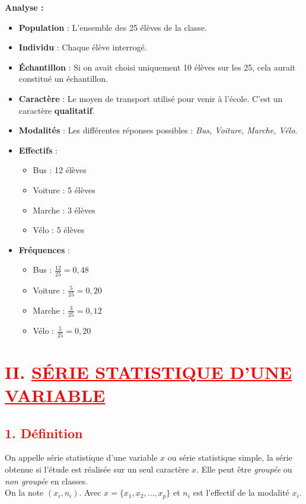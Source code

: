 \documentclass[12pt,a4paper]{article}
\begin{document}
\vspace{0.5cm}

\textbf{Analyse :}
\begin{itemize}
    \item \textbf{Population} : L’ensemble des 25 élèves de la classe.
    \item \textbf{Individu} : Chaque élève interrogé.
    \item \textbf{Échantillon} : Si on avait choisi uniquement 10 élèves sur les 25, cela aurait constitué un échantillon.
    \item \textbf{Caractère} : Le moyen de transport utilisé pour venir à l’école. C’est un caractère \textbf{qualitatif}.
    \item \textbf{Modalités} : Les différentes réponses possibles : \textit{Bus, Voiture, Marche, Vélo}.
    \item \textbf{Effectifs} :
    \begin{itemize}
        \item Bus : 12 élèves
        \item Voiture : 5 élèves
        \item Marche : 3 élèves
        \item Vélo : 5 élèves
    \end{itemize}
    \item \textbf{Fréquences} :
    \begin{itemize}
        \item Bus : \( \frac{12}{25} = 0{,}48 \)
        \item Voiture : \( \frac{5}{25} = 0{,}20 \)
        \item Marche : \( \frac{3}{25} = 0{,}12 \)
        \item Vélo : \( \frac{5}{25} = 0{,}20 \)
    \end{itemize}
\end{itemize}

\section*{\textcolor{red}{II. \underline{SÉRIE STATISTIQUE D’UNE VARIABLE}}}

\subsection*{\textcolor{red}{1. Définition}}

On appelle série statistique d’une variable \( x \) ou série statistique simple, la série obtenue si l’étude est réalisée sur un seul caractère \( x \). Elle peut être \textit{groupée} ou \textit{non groupée} en classes.\\
On la note \( (x_i, n_i) \). Avec \( x = \{x_1, x_2, \dots, x_p\} \) et \( n_i \) est l’effectif de la modalité \( x_i \).
\end{document}
